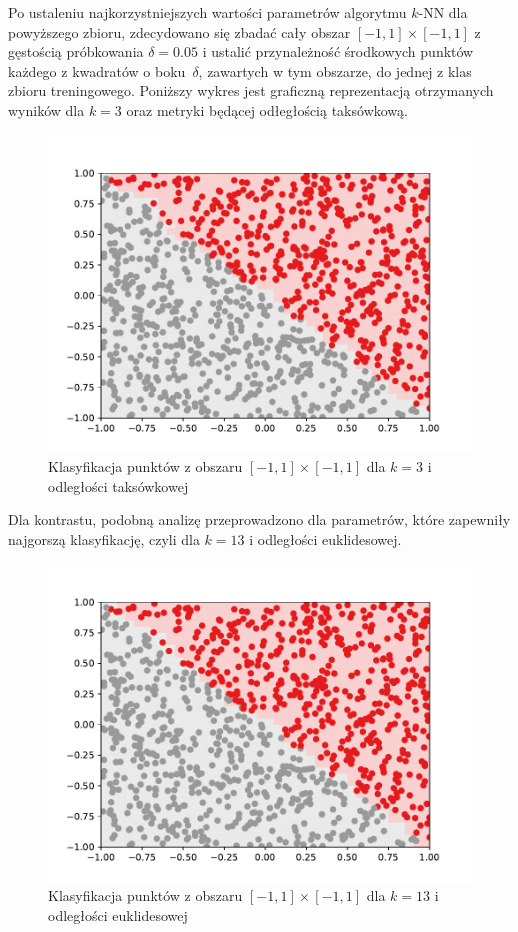 \documentclass[11pt,a4paper]{article}
\begin{document}
Po ustaleniu najkorzystniejszych wartości parametrów algorytmu $k$-NN dla powyższego zbioru, zdecydowano się zbadać cały obszar $[-1,1] \times [-1,1]$ z gęstością próbkowania $\delta = 0.05$ i ustalić przynależność środkowych punktów każdego z kwadratów o boku~$\delta$, zawartych w tym obszarze, do jednej z klas zbioru treningowego. Poniższy wykres jest graficzną reprezentacją otrzymanych wyników dla $k = 3$ oraz metryki będącej odłegłością taksówkową.

\begin{figure}[H]
  \centering
  \includegraphics[width=.8\textwidth]{res/simple-manhattan-3.pdf}
  \caption{Klasyfikacja punktów z obszaru $[-1,1] \times [-1,1]$ dla $k = 3$ i odległości taksówkowej}
  \label{fig:simple-manhattan-3}
\end{figure}

Dla kontrastu, podobną analizę przeprowadzono dla parametrów, które zapewniły najgorszą klasyfikację, czyli dla $k=13$ i odległości euklidesowej.

\begin{figure}[H]
  \centering
  \includegraphics[width=.8\textwidth]{res/simple-euclidean-13.pdf}
  \caption{Klasyfikacja punktów z obszaru $[-1,1] \times [-1,1]$ dla $k = 13$ i odległości euklidesowej}
  \label{fig:simple-euclidean-13}
\end{figure}
\end{document}
